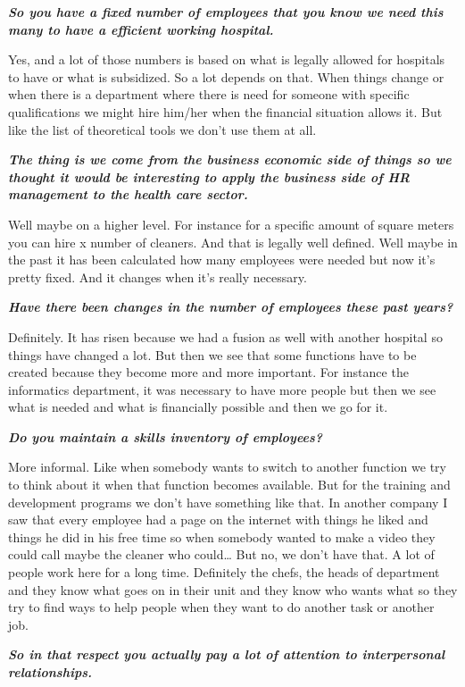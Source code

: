 \documentclass[a4paper,fleqn,11pt,dvips,titlepage]{article}
\newcommand{\question}[1]{\textbf{\textit{#1}}}
\numberwithin{figure}{section}
\numberwithin{equation}{section}
\begin{document}
\question{So you have a fixed number of employees that you know we need this many to have a efficient working hospital.}

Yes, and a lot of those numbers is based on what is legally allowed for hospitals to have or what is subsidized. So a lot depends on that. When things change or when there is a department where there is need for someone with specific qualifications we might hire him/her when the financial situation allows it. But like the list of theoretical tools we don’t use them at all. 

\question{The thing is we come from the business economic side of things so we thought it would be interesting to apply the business side of HR management to the health care sector.}

Well maybe on a higher level. For instance for a specific amount of square meters you can hire x number of cleaners. And that is legally well defined. Well maybe in the past it has been calculated how many employees were needed but now it’s pretty fixed. And it changes when it’s really necessary. 

\question{Have there been changes in the number of employees these past years?}

Definitely. It has risen because we had a fusion as well with another hospital so things have changed a lot. But then we see that some functions have to be created because they become more and more important. For instance the informatics  department, it was necessary to have more people but then we see what is needed and what is financially possible and then we go for it. 

\question{Do you maintain a skills inventory of employees?}

More informal. Like  when somebody wants to switch to another function we try to think about it when that function becomes available. But for the training and development programs we don’t have something like that. In another company I saw that every employee had a page on the internet with things he liked and things he did in his free time so when somebody wanted to make a video they could call maybe the cleaner who could… But no, we don’t have that. A lot of people work here for a long time. Definitely the chefs, the heads of department and they know what goes on in their unit and they know who wants what so they try to find ways to help people when they want to do another task or another job. 

\question{So in that respect you actually pay a lot of attention to interpersonal relationships.}
\end{document}
